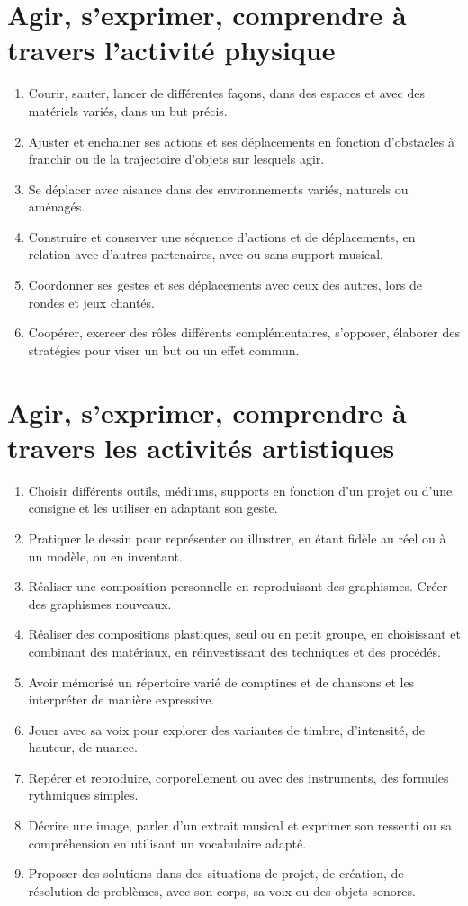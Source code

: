 \section{Agir, s’exprimer, comprendre à travers l’activité physique}
\begin{enumerate}
\item Courir, sauter, lancer de différentes façons, dans des espaces et avec des matériels variés, dans un but précis. 
\item Ajuster et enchainer ses actions et ses déplacements en fonction d’obstacles à franchir ou de la trajectoire d’objets sur lesquels agir.
\item Se déplacer avec aisance dans des environnements variés, naturels ou aménagés. 
\item Construire et conserver une séquence d’actions et de déplacements, en relation avec d’autres partenaires, avec ou sans support musical.
\item Coordonner ses gestes et ses déplacements avec ceux des autres, lors de rondes et jeux chantés.
\item Coopérer, exercer des rôles différents complémentaires, s’opposer, élaborer des stratégies pour viser un but ou un effet commun. 
\end{enumerate}

\section{Agir, s’exprimer, comprendre à travers les activités artistiques}
\begin{enumerate}
\item Choisir différents outils, médiums, supports en fonction d’un projet ou d’une consigne et les utiliser en adaptant son geste.
\item Pratiquer le dessin pour représenter ou illustrer, en étant fidèle au réel ou à un modèle, ou en inventant. 
\item Réaliser une composition personnelle en reproduisant des graphismes. Créer des graphismes nouveaux.
\item Réaliser des compositions plastiques, seul ou en petit groupe, en choisissant et combinant des matériaux, en réinvestissant des techniques et des procédés.
\item Avoir mémorisé un répertoire varié de comptines et de chansons et les interpréter de manière expressive. 
\item Jouer avec sa voix pour explorer des variantes de timbre, d’intensité, de hauteur, de nuance. 
\item Repérer et reproduire, corporellement ou avec des instruments, des formules rythmiques simples. 
\item Décrire une image, parler d’un extrait musical et exprimer son ressenti ou sa compréhension en utilisant un vocabulaire adapté.
\item Proposer des solutions dans des situations de projet, de création, de résolution de problèmes, avec son corps, sa voix ou des objets sonores.
\end{enumerate}

